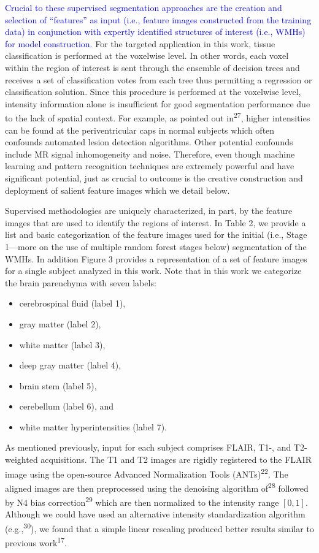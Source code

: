 \documentclass[11pt,]{article}
\providecommand{\tightlist}{%
  \setlength{\itemsep}{0pt}\setlength{\parskip}{0pt}}
\begin{document}
\textcolor{blue}{
Crucial to these supervised segmentation approaches are the creation and selection of
``features'' as input (i.e., feature images constructed from the training data)
in conjunction with expertly identified structures of interest
(i.e., WMHs) for model construction.} For the targeted application in
this work, tissue classification is performed at the voxelwise level. In
other words, each voxel within the region of interest is sent through
the ensemble of decision trees and receives a set of classification
votes from each tree thus permitting a regression or classification
solution. Since this procedure is performed at the voxelwise level,
intensity information alone is insufficient for good segmentation
performance due to the lack of spatial context. For example, as pointed
out in\textsuperscript{27}, higher intensities can be found at the
periventricular caps in normal subjects which often confounds automated
lesion detection algorithms. Other potential confounds include MR signal
inhomogeneity and noise. Therefore, even though machine learning and
pattern recognition techniques are extremely powerful and have
significant potential, just as crucial to outcome is the creative
construction and deployment of salient feature images which we detail
below.

Supervised methodologies are uniquely characterized, in part, by the
feature images that are used to identify the regions of interest. In
Table 2, we provide a list and basic categorization of the feature
images used for the initial (i.e., Stage 1---more on the use of multiple
random forest stages below) segmentation of the WMHs. In addition Figure
3 provides a representation of a set of feature images for a single
subject analyzed in this work. Note that in this work we categorize the
brain parenchyma with seven labels:

\begin{itemize}
\tightlist
\item
  cerebrospinal fluid (label 1),
\item
  gray matter (label 2),
\item
  white matter (label 3),
\item
  deep gray matter (label 4),
\item
  brain stem (label 5),
\item
  cerebellum (label 6), and
\item
  white matter hyperintensities (label 7).
\end{itemize}

As mentioned previously, input for each subject comprises FLAIR, T1-,
and T2-weighted acquisitions. The T1 and T2 images are rigidly
registered to the FLAIR image using the open-source Advanced
Normalization Tools (ANTs)\textsuperscript{22}. The aligned images are
then preprocessed using the denoising algorithm of\textsuperscript{28}
followed by N4 bias correction\textsuperscript{29} which are then
normalized to the intensity range \([0,1]\). Although we could have used
an alternative intensity standardization algorithm
(e.g.,\textsuperscript{30}), we found that a simple linear rescaling
produced better results similar to previous work\textsuperscript{17}.
\end{document}
